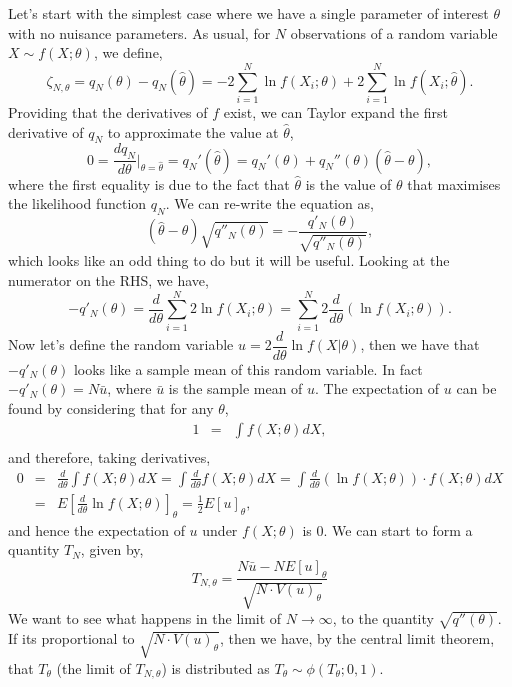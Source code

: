 Let's start with the simplest case where we have a single parameter of interest $\theta$ with no nuisance parameters. As usual, for $N$ observations of a random variable $X\sim f(X;\theta)$, we define, 
\begin{equation}
    \zeta_{N,\theta} = q_{N}(\theta)-q_{N}(\hat{\theta}) = -2\sum_{i=1}^{N}\ln f(X_{i};\theta) + 2\sum_{i=1}^{N}\ln f(X_{i};\hat{\theta}) .
\end{equation}
Providing that the derivatives of $f$ exist, we can Taylor expand the first derivative of $q_N$ to approximate the value at $\hat{\theta}$, 
\begin{equation}
   0= \frac{dq_{N}}{d\theta}\bigg|_{\theta=\hat{\theta}} = q_{N}'(\hat{\theta})  = q_{N}'(\theta)+q_{N}''(\theta) (\hat{\theta}-\theta),
\end{equation}
where the first equality is due to the fact that $\hat\theta$ is the value of $\theta$ that maximises the likelihood function $q_{N}$. We can re-write the equation as, 
\begin{equation}\label{eqn:randvarwt}
    (\hat{\theta}-\theta)\sqrt{q''_{N}(\theta)} = -\frac{q'_{N}(\theta)}{\sqrt{q''_{N}(\theta)}},
\end{equation}
which looks like an odd thing to do but it will be useful. Looking at the numerator on the RHS, we have, 
\begin{equation}
    -q'_{N}(\theta) = \frac{d}{d\theta}\sum_{i=1}^{N}2\ln f(X_{i};\theta)= \sum_{i=1}^{N} 2\frac{d}{d\theta}\left(\ln f(X_{i};\theta)\right).
\end{equation}
Now let's define the random variable $u=2\dfrac{d}{d\theta}\ln f(X|\theta)$, then we have that $-q'_{N}(\theta)$ looks like a sample mean of this random variable. In fact $-q'_{N}(\theta)=N\bar{u}$, where $\bar{u}$ is the sample mean of $u$. The expectation of $u$ can be found by considering that for any $\theta$,
\begin{eqnarray}
    1 &=& \int f(X;\theta)dX,                      \\
\end{eqnarray}
and therefore, taking derivatives,
\begin{eqnarray}
    0 &=& \frac{d}{d\theta} \int f(X;\theta)dX = \int \frac{d}{d\theta}  f(X;\theta)dX = \int \frac{d}{d\theta} \left(\ln f(X;\theta)\right)\cdot f(X;\theta)dX  \\ 
      &=& E\left[\frac{d}{d\theta}\ln f(X;\theta)\right]_{\theta} = \frac{1}{2}E\left[u\right]_{\theta},  
\end{eqnarray}
and hence the expectation of $u$ under $f(X;\theta)$ is 0. 
We can start to form a quantity $T_{N}$, given by, 
\begin{equation}
    T_{N,\theta} = \frac{N\bar{u} - NE[u]_{\theta}}{\sqrt{N\cdot V(u)_{\theta}}}
\end{equation}
We want to see what happens in the limit of $N\rightarrow\infty$, to the quantity $\sqrt{q''(\theta)}$. If its proportional to $\sqrt{N\cdot V(u)_{\theta}}$, then we have, by the central limit theorem, that $T_{\theta}$ (the limit of $T_{N,\theta}$) is distributed as $T_{\theta}\sim\phi(T_{\theta};0,1)$.

